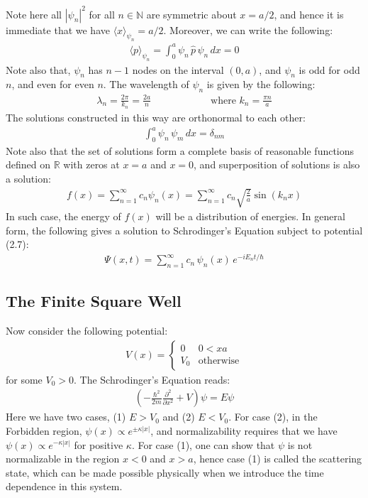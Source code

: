\documentclass[11pt]{book}
\theoremstyle{break}
\theoremstyle{break}
\newcommand{\R}{\mathbb{R}}
\newcommand{\N}{\mathbb{N}}
\newcommand{\pd}{\partial}
\begin{document}
Note here all $|\psi_n|^2$ for all $n \in \N$ are symmetric about $x =a/2$, and hence it is immediate that we have $\langle x\rangle_{\psi_n} =a/2$. Moreover, we can write the following:
\begin{align*}
\langle p\rangle_{\psi_n} = \int_0^a \psi_n \,\hat{p}\,\psi_n \, dx = 0
\end{align*}
Note also that, $\psi_n$ has $n-1$ nodes on the interval $(0,a)$, and $\psi_n$ is odd for odd $n$, and even for even $n$. The wavelength of $\psi_n$ is given by the following:
\begin{align*}
\lambda_n = \frac{2\pi}{k_n} = \frac{2a}{n} \qquad\qquad\qquad \text{where }k_n = \frac{\pi n}{a} 
\end{align*}
The solutions constructed in this way are orthonormal to each other:
\begin{align*}
\int_0^a \psi_n\,\psi_m\, dx = \delta_{nm}
\end{align*}
Note also that the set of solutions form a complete basis of reasonable functions defined on $\R$ with zeros at $x=a$ and $x=0$, and superposition of solutions is also a solution:
\begin{align*}
f(x) = \sum_{n=1}^\infty c_n \psi_n(x) = \sum_{n=1}^\infty c_n \sqrt{\frac{2}{a}}\sin(k_n x)
\end{align*}
In such case, the energy of $f(x)$ will be a distribution of energies. In general form, the following gives a solution to Schrodinger's Equation subject to potential (2.7):
\begin{align*}
\Psi(x,t) = \sum_{n=1}^\infty c_n \, \psi_n(x) \, e^{-iE_nt/\hbar}
\end{align*}
\subsection{The Finite Square Well}
Now consider the following potential:
\begin{align*}
V(x) = \begin{cases} 
0 & 0<xa\\
V_0 & \text{otherwise}
\end{cases}
\end{align*}
for some $V_0 > 0$. The Schrodinger's Equation reads:
\begin{align}
\left(-\frac{\hbar^2}{2m}\frac{\pd^2}{\pd x^2} +V\right)\psi = E\psi
\end{align}
Here we have two cases, (1) $E>V_0$ and (2) $E<V_0$. For case (2), in the Forbidden region, $\psi(x) \propto e^{\pm \kappa |x|}$, and normalizability requires that we have $\psi(x) \propto e^{-\kappa|x|}$ for positive $\kappa$. For case (1), one can show that $\psi$ is not normalizable in the region $x<0$ and $x >a$, hence case (1) is called the scattering state, which can be made possible physically when we introduce the time dependence in this system.\\
\end{document}
